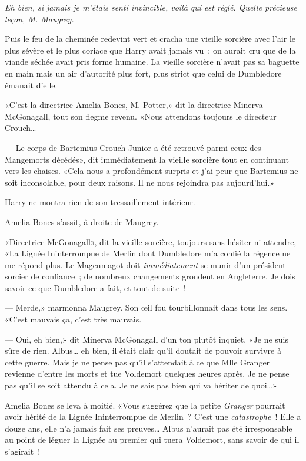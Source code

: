 \emph{Eh bien, si jamais je m'étais senti invincible, voilà qui est réglé. Quelle précieuse leçon, M. Maugrey.}

Puis le feu de la cheminée redevint vert et cracha une vieille sorcière avec l'air le plus sévère et le plus coriace que Harry avait jamais vu~; on aurait cru que de la viande séchée avait pris forme humaine. La vieille sorcière n'avait pas sa baguette en main mais un air d'autorité plus fort, plus strict que celui de Dumbledore émanait d'elle.

«C'est la directrice Amelia Bones, M. Potter,» dit la directrice Minerva McGonagall, tout son flegme revenu. «Nous attendons toujours le directeur Crouch…

--- Le corps de Bartemius Crouch Junior a été retrouvé parmi ceux des Mangemorts décédés», dit immédiatement la vieille sorcière tout en continuant vers les chaises. «Cela nous a profondément surpris et j'ai peur que Bartemius ne soit inconsolable, pour deux raisons. Il ne nous rejoindra pas aujourd'hui.»

Harry ne montra rien de son tressaillement intérieur.

Amelia Bones s'assit, à droite de Maugrey.

«Directrice McGonagall», dit la vieille sorcière, toujours sans hésiter ni attendre, «La Lignée Ininterrompue de Merlin dont Dumbledore m'a confié la régence ne me répond plus. Le Magenmagot doit \emph{immédiatement} se munir d'un président-sorcier de confiance~; de nombreux changements grondent en Angleterre. Je dois savoir ce que Dumbledore a fait, et tout de suite~!

--- Merde,» marmonna Maugrey. Son œil fou tourbillonnait dans tous les sens. «C'est mauvais ça, c'est très mauvais.

--- Oui, eh bien,» dit Minerva McGonagall d'un ton plutôt inquiet. «Je ne suis sûre de rien. Albus… eh bien, il était clair qu'il doutait de pouvoir survivre à cette guerre. Mais je ne pense pas qu'il s'attendait à ce que Mlle Granger revienne d'entre les morts et tue Voldemort quelques heures après. Je ne pense pas qu'il se soit attendu à cela. Je ne sais pas bien qui va hériter de quoi…»

Amelia Bones se leva à moitié. «Vous suggérez que la petite \emph{Granger} pourrait avoir hérité de la Lignée Ininterrompue de Merlin~? C'est une \emph{catastrophe}~! Elle a douze ans, elle n'a jamais fait ses preuves… Albus n'aurait pas été irresponsable au point de léguer la Lignée au premier qui tuera Voldemort, sans savoir de qui il s'agirait~!

